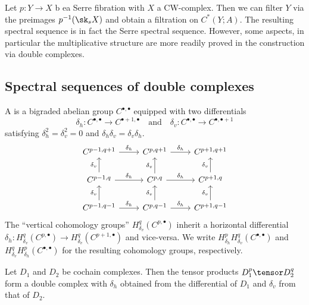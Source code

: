 \begin{example}
	Let $p\colon Y \to X$ b ea Serre fibration with $X$ a CW-complex.
	Then we can filter $Y$ via the preimages $p^{-1}(\sk_s X)$ and obtain a filtration on $C^*(Y; A)$.
	The resulting spectral sequence is in fact the Serre spectral sequence.
	However, some aspects, in particular the multiplicative structure are more readily proved in the construction via double complexes.
\end{example}
\subsection{Spectral sequences of double complexes}
\begin{definition}
	A  is a bigraded abelian group $C^{\bullet, \bullet}$ equipped with two differentials
	\begin{equation*}
		\delta_h\colon C^{\bullet, \bullet} \to C^{\bullet + 1, \bullet} \quad\text{and}\quad \delta_v\colon C^{\bullet, \bullet} \to C^{\bullet, \bullet + 1}
	\end{equation*}
	satisfying $\delta_h^2 = \delta_v^2 = 0$ and $\delta_h \delta_v = \delta_v \delta_h$.
	\begin{equation*}
		\begin{tikzcd}
			C^{p - 1, q + 1}
					\ar[r, "\delta_h"]
				& C^{p, q + 1}
					\ar[r, "\delta_h"]
				& C^{p + 1, q + 1}
			\\
			C^{p - 1, q}
					\ar[r, "\delta_h"]
					\ar[u, "\delta_v"]
				& C^{p, q}
					\ar[r, "\delta_h"]
					\ar[u, "\delta_v"]
				& C^{p + 1, q}
					\ar[u, "\delta_v"]
			\\
			C^{p - 1, q - 1}
					\ar[r, "\delta_h"]
					\ar[u, "\delta_v"]
				& C^{p, q - 1}
					\ar[r, "\delta_h"]
					\ar[u, "\delta_v"]
				& C^{p + 1, q - 1}
					\ar[u, "\delta_v"]
		\end{tikzcd}
	\end{equation*}
	The \enquote{vertical cohomology groups} $H^q_{\delta_v}(C^{p, \bullet})$ inherit a horizontal differential $\delta_h\colon H^q_{\delta_v}(C^{p, \bullet}) \to H^q_{\delta_v}(C^{p + 1, \bullet})$ and vice-versa.
	We write $H_{\delta_h}^p H_{\delta_v}^q(C^{\bullet, \bullet})$ and $H_{\delta_v}^q H_{\delta_h}^p(C^{\bullet, \bullet})$ for the resulting cohomology groups, respectively.
\end{definition}
\begin{example}
	Let $D_1$ and $D_2$ be cochain complexes. 
	Then the tensor products $D_1^p \tensor D_2^q$ form a double complex with $\delta_h$ obtained from the differential of $D_1$ and $\delta_v$ from that of $D_2$.
\end{example}
